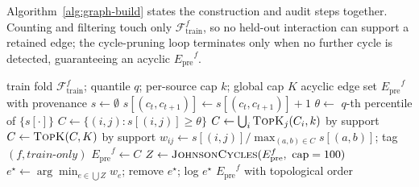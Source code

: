 \documentclass[preprint,10pt,doubleblind]{elsarticle}
\newcommand{\Epre}{\ensuremath{E_{\text{pre}}}}
\begin{document}
Algorithm~\ref{alg:graph-build} states the construction and audit steps
together. Counting and filtering touch only $\mathcal{F}^f_{\text{train}}$,
so no held-out interaction can support a retained edge; the cycle-pruning loop
terminates only when no further cycle is detected, guaranteeing an acyclic
$\Epre^f$.

\begin{algorithm}[t]
\caption{Train-only prerequisite graph construction with DAG audit}
\label{alg:graph-build}
\begin{algorithmic}[1]
\Require train fold $\mathcal{F}^f_{\text{train}}$; quantile $q$; per-source cap
  $k$; global cap $K$
\Ensure acyclic edge set $\Epre^f$ with provenance
\State $s \gets \emptyset$ 
    \State $s[(c_t,c_{t+1})] \gets s[(c_t,c_{t+1})] + 1$
  \EndFor
\EndFor
\State $\theta \gets$ $q$-th percentile of $\{s[\cdot]\}$ 
\State $C \gets \{(i,j) : s[(i,j)] \ge \theta\}$
\State $C \gets \bigcup_{i} \textsc{TopK}_{j}(C_i, k)$ by support 
\State $C \gets \textsc{TopK}(C, K)$ by support 
  \State $w_{ij} \gets s[(i,j)]/\max_{(a,b)\in C} s[(a,b)]$; tag $(f,\textit{train-only})$
\EndFor
\State $\Epre^f \gets C$
\While{$\Epre^f$ contains a cycle} 
  \State $Z \gets \textsc{JohnsonCycles}(\Epre^f,\ \text{cap}=100)$
  \State $e^\star \gets \arg\min_{e\in\bigcup Z} w_e$; remove $e^\star$; log $e^\star$
\EndWhile
\State \Return $\Epre^f$ with topological order
\end{algorithmic}
\end{algorithm}
\end{document}
